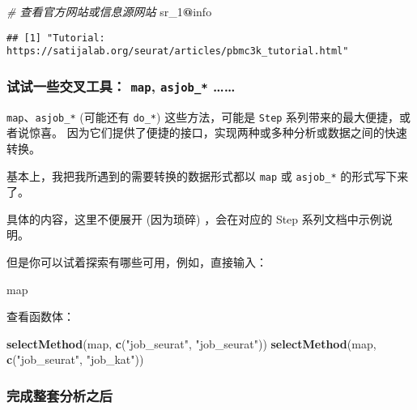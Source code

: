 \documentclass[
]{article}
\newenvironment{Shaded}{\begin{snugshade}}{\end{snugshade}}
\newcommand{\CommentTok}[1]{\textcolor[rgb]{0.56,0.35,0.01}{\textit{#1}}}
\newcommand{\DecValTok}[1]{\textcolor[rgb]{0.00,0.00,0.81}{#1}}
\newcommand{\KeywordTok}[1]{\textcolor[rgb]{0.13,0.29,0.53}{\textbf{#1}}}
\newcommand{\NormalTok}[1]{#1}
\newcommand{\OperatorTok}[1]{\textcolor[rgb]{0.81,0.36,0.00}{\textbf{#1}}}
\newcommand{\StringTok}[1]{\textcolor[rgb]{0.31,0.60,0.02}{#1}}
\begin{document}
\begin{Shaded}
\begin{Highlighting}[]
\CommentTok{\# 查看官方网站或信息源网站}
\NormalTok{sr\_}\DecValTok{1}\OperatorTok{@}\NormalTok{info}
\end{Highlighting}
\end{Shaded}

\begin{verbatim}
## [1] "Tutorial: https://satijalab.org/seurat/articles/pbmc3k_tutorial.html"
\end{verbatim}

\hypertarget{ux8bd5ux8bd5ux4e00ux4e9bux4ea4ux53c9ux5de5ux5177-map-asjob_}{%
\subsubsection{\texorpdfstring{试试一些交叉工具： \texttt{map}, \texttt{asjob\_*} \ldots\ldots{}}{试试一些交叉工具： map, asjob\_* \ldots\ldots{}}}\label{ux8bd5ux8bd5ux4e00ux4e9bux4ea4ux53c9ux5de5ux5177-map-asjob_}}

\texttt{map}、\texttt{asjob\_*} (可能还有 \texttt{do\_*}) 这些方法，可能是 \texttt{Step} 系列带来的最大便捷，或者说惊喜。
因为它们提供了便捷的接口，实现两种或多种分析或数据之间的快速转换。

基本上，我把我所遇到的需要转换的数据形式都以 \texttt{map} 或 \texttt{asjob\_*} 的形式写下来了。

具体的内容，这里不便展开 (因为琐碎) ，会在对应的 Step 系列文档中示例说明。

但是你可以试着探索有哪些可用，例如，直接输入：

\begin{Shaded}
\begin{Highlighting}[]
\NormalTok{map}
\end{Highlighting}
\end{Shaded}

查看函数体：

\begin{Shaded}
\begin{Highlighting}[]
\KeywordTok{selectMethod}\NormalTok{(map, }\KeywordTok{c}\NormalTok{(}\StringTok{"job\_seurat"}\NormalTok{, }\StringTok{"job\_seurat"}\NormalTok{))}
\KeywordTok{selectMethod}\NormalTok{(map, }\KeywordTok{c}\NormalTok{(}\StringTok{"job\_seurat"}\NormalTok{, }\StringTok{"job\_kat"}\NormalTok{))}
\end{Highlighting}
\end{Shaded}

\hypertarget{ux5b8cux6210ux6574ux5957ux5206ux6790ux4e4bux540e}{%
\subsubsection{完成整套分析之后}\label{ux5b8cux6210ux6574ux5957ux5206ux6790ux4e4bux540e}}
\end{document}
